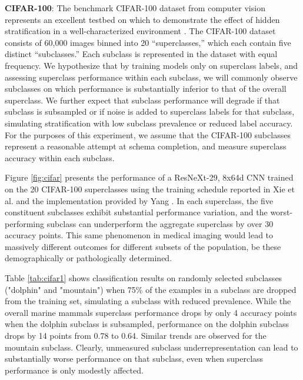 \documentclass{article}
\begin{document}
\textbf{CIFAR-100}: The benchmark CIFAR-100 dataset from computer vision represents an excellent testbed on which to demonstrate the effect of hidden stratification in a well-characterized environment \citep{Krizhevsky2009-tq}.  
The CIFAR-100 dataset consists of 60,000 images binned into 20 ``superclasses,'' which each contain five distinct ``subclasses.'' 
 Each subclass is represented in the dataset with equal frequency.  
 We hypothesize that by training models only on superclass labels, and assessing superclass performance within each subclass, we will commonly observe subclasses on which performance is substantially inferior to that of the overall superclass.  
  We further expect that subclass performance will degrade if that subclass is subsampled or if noise is added to superclass labels for that subclass, simulating stratification with low subclass prevalence or reduced label accuracy.
 For the purposes of this experiment, we assume that the CIFAR-100 subclasses represent a reasonable attempt at schema completion, and measure superclass accuracy within each subclass.
 
 Figure \ref{fig:cifar} presents the performance of a ResNeXt-29, 8x64d CNN trained on the 20 CIFAR-100 superclasses using the training schedule reported in Xie et al. \citep{Xie2016-ip} and the implementation provided by Yang \citep{Yang_undated-bt}.  
In each superclass, the five constituent subclasses exhibit substantial performance variation, and the worst-performing subclass can underperform the aggregate superclass by over 30 accuracy points.  
This same phenomenon in medical imaging would lead to massively different outcomes for different subsets of the population, be these demographically or pathologically determined. 

 Table \ref{tab:cifar1} shows classification results on randomly selected subclasses ("dolphin" and "mountain") when 75\% of the examples in a subclass are dropped from the training set, simulating a subclass with reduced prevalence.  
 While the overall marine mammals superclass performance drops by only 4 accuracy points when the dolphin subclass is subsampled, performance on the dolphin subclass drops by 14 points from 0.78 to 0.64.  
 Similar trends are observed for the mountain subclass.  
 Clearly, unmeasured subclass underrepresentation can lead to substantially worse performance on that subclass, even when superclass performance is only modestly affected.
 
\end{document}
